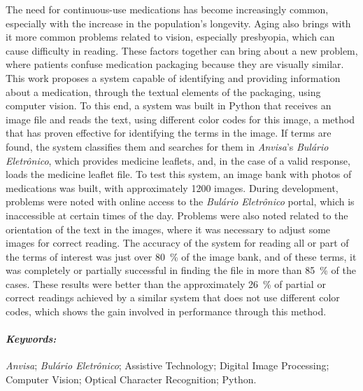 The need for continuous-use medications has become increasingly common, especially with the increase in the population's longevity.
Aging also brings with it more common problems related to vision, especially presbyopia, which can cause difficulty in reading.
These factors together can bring about a new problem, where patients confuse medication packaging because they are visually similar.
This work proposes a system capable of identifying and providing information about a medication, through the textual elements of the packaging, using computer vision.
To this end, a system was built in Python that receives an image file and reads the text, using different color codes for this image, a method that has proven effective for identifying the terms in the image.
If terms are found, the system classifies them and searches for them in \emph{Anvisa}'s \emph{Bulário Eletrônico}, which provides medicine leaflets, and, in the case of a valid response, loads the medicine leaflet file.
To test this system, an image bank with photos of medications was built, with approximately \num{1200} images.
During development, problems were noted with online access to the \emph{Bulário Eletrônico} portal, which is inaccessible at certain times of the day.
Problems were also noted related to the orientation of the text in the images, where it was necessary to adjust some images for correct reading.
The accuracy of the system for reading all or part of the terms of interest was just over \SI{80}{\percent} of the image bank, and of these terms, it was completely or partially successful in finding the file in more than \SI{85}{\percent} of the cases.
These results were better than the approximately \SI{26}{\percent} of partial or correct readings achieved by a similar system that does not use different color codes, which shows the gain involved in performance through this method.

\paragraph*{\textit{Keywords:}} \emph{Anvisa}; \emph{Bulário Eletrônico}; Assistive Technology; Digital Image Processing; Computer Vision; Optical Character Recognition; Python.
